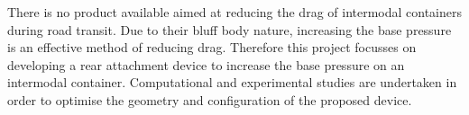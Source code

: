 

There is no product available aimed at reducing the drag of intermodal containers during road transit. Due to their bluff body nature, increasing the base pressure is an effective method of reducing drag. Therefore this project focusses on developing a rear attachment device to increase the base pressure on an intermodal container. Computational and experimental studies are undertaken in order to optimise the geometry and configuration of the proposed device. \\



